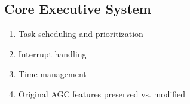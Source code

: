 \subsection{Core Executive System}

\begin{enumerate}
    \item Task scheduling and prioritization
    \item Interrupt handling
    \item Time management
    \item Original AGC features preserved vs. modified 
\end{enumerate}
